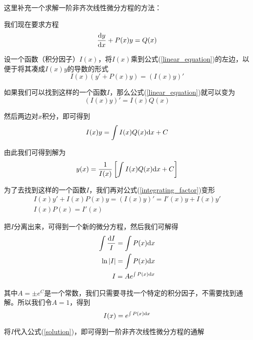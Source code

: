 \begin{note}
    这里补充一个求解一阶非齐次线性微分方程的方法：

    我们现在要求方程
    \begin{equation}
        \dfrac{\mathrm{d} y}{\mathrm{d} x}+P(x)y=Q(x) \label{linear_equation}
    \end{equation}

    设一个函数（积分因子）$I(x)$，将$I(x)$乘到公式(\ref{linear_equation})的左边，以便于将其凑成$I(x)y$的导数的形式
    \begin{equation}
        I(x)(y'+P(x)y)=(I(x)y)' \label{integrating_factor}
    \end{equation}

    如果我们可以找到这样的一个函数$I$，那么公式(\ref{linear_equation})就可以变为
    \begin{equation*}
        (I(x)y)'=I(x)Q(x)
    \end{equation*}

    然后两边对$x$积分，即可得到
    \begin{equation*}
        I(x)y=\int I(x)Q(x)\mathrm{d} x+C
    \end{equation*}

    由此我们可得到解为
    \begin{equation}
        y(x)=\dfrac{1}{I(x)}\left[\int I(x)Q(x)\mathrm{d} x+C\right] \label{solution}
    \end{equation}

    为了去找到这样的一个函数$I$，我们再对公式(\ref{integrating_factor})变形
    \begin{align*}
        I(x)y'+I(x)P(x)y=(I(x)y)'=I'(x)y+I(x)y' \\
        I(x)P(x)=I'(x)
    \end{align*}

    把$I$分离出来，可得到一个新的微分方程，然后我们可解得
    \begin{align*}
        \int\dfrac{\mathrm{d} I}{I}=\int P(x)\mathrm{d} x \\
        \ln |I|=\int P(x)\mathrm{d} x \\
        I=Ae^{\int P(x)\mathrm{d} x}
    \end{align*}

    其中$A=\pm e^C$是一个常数，我们只需要寻找一个特定的积分因子，不需要找到通解。所以我们令$A=1$，得到
    \begin{equation*}
        I(x)=e^{\int P(x)\mathrm{d} x}
    \end{equation*}

    将$I$代入公式(\ref{solution})，即可得到一阶非齐次线性微分方程的通解
\end{note}

